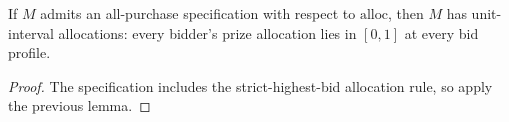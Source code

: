 \begin{lemma}\label{thm:MathEconLib.Mechanism.Auctions.AllPurchaseSpec.isUnitIntervalAllocation}\leanok
{}
If $M$ admits an all-purchase specification with respect to $\mathrm{alloc}$, then $M$ has unit-interval allocations: every bidder's prize allocation lies in $[0,1]$ at every bid profile.
\end{lemma}
\begin{proof}\leanok
{}
The specification includes the strict-highest-bid allocation rule, so apply the previous lemma.
\end{proof}
